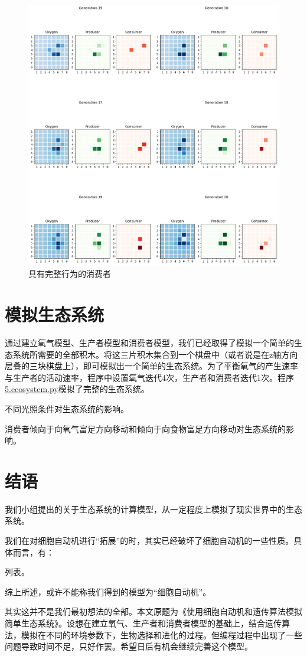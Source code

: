 \documentclass{ctexart}
\begin{document}
\begin{figure}[ht]
  \centering
  \includegraphics[width=\textwidth]{consumer.png}
  \caption{具有完整行为的消费者}
  \label{fig:consumer}
\end{figure}

\section{模拟生态系统}

通过建立氧气模型、生产者模型和消费者模型，我们已经取得了模拟一个简单的生态系统所需要的全部积木。将这三片积木集合到一个棋盘中（或者说是在z轴方向层叠的三块棋盘上），即可模拟出一个简单的生态系统。为了平衡氧气的产生速率与生产者的活动速率，程序中设置氧气迭代4次，生产者和消费者迭代1次。程序\underline{5.ecosystem.py}模拟了完整的生态系统。

不同光照条件对生态系统的影响。

消费者倾向于向氧气富足方向移动和倾向于向食物富足方向移动对生态系统的影响。

\section{结语}

我们小组提出的关于生态系统的计算模型，从一定程度上模拟了现实世界中的生态系统。

我们在对细胞自动机进行“拓展”的时，其实已经破坏了细胞自动机的一些性质。具体而言，有：

列表。

综上所述，或许不能称我们得到的模型为“细胞自动机”。

其实这并不是我们最初想法的全部。本文原题为《使用细胞自动机和遗传算法模拟简单生态系统》。设想在建立氧气、生产者和消费者模型的基础上，结合遗传算法，模拟在不同的环境参数下，生物选择和进化的过程。但编程过程中出现了一些问题导致时间不足，只好作罢。希望日后有机会继续完善这个模型。
\end{document}
